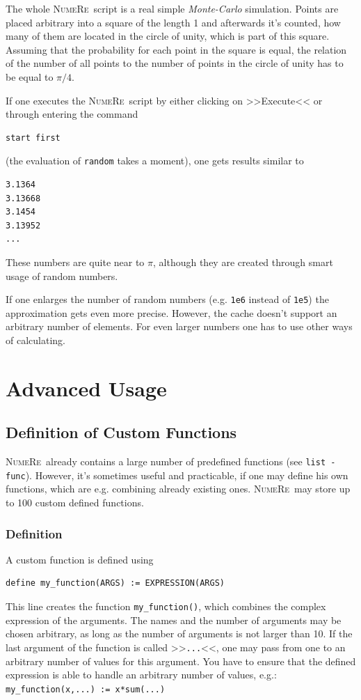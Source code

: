 \documentclass[DIV=14,headsepline,footsepline]{scrbook}
\newcommand{\NR}{\textsc{Nu\-me\-Re}}
\begin{document}
				The whole \NR\ script is a real simple \emph{Monte-Carlo} simulation. Points are placed arbitrary into a square of the length 1 and afterwards it's counted, how many of them are located in the circle of unity, which is part of this square. Assuming that the probability for each point in the square is equal, the relation of the number of all points to the number of points in the circle of unity has to be equal to $\pi/4$.
				
				If one executes the \NR\ script by either clicking on >>Execute<< or through entering the command
				\begin{lstlisting}
start first
				\end{lstlisting}
				(the evaluation of \lstinline+random+ takes a moment), one gets results similar to
				\begin{lstlisting}
3.1364
3.13668
3.1454
3.13952
...
				\end{lstlisting}
				These numbers are quite near to $\pi$, although they are created through smart usage of random numbers.
				
				If one enlarges the number of random numbers (e.g. \lstinline+1e6+ instead of \lstinline+1e5+) the approximation gets even more precise. However, the cache doesn't support an arbitrary number of elements. For even larger numbers one has to use other ways of calculating.
	\part{Advanced Usage}
		\chapter{Definition of Custom Functions}
			\NR\ already contains a large number of predefined functions (see \lstinline+list -func+). However, it's sometimes useful and practicable, if one may define his own functions, which are e.g. combining already existing ones. \NR\ may store up to 100 custom defined functions.
			\section{Definition}
				A custom function is defined using
				\begin{lstlisting}
define my_function(ARGS) := EXPRESSION(ARGS)
				\end{lstlisting}
				This line creates the function \lstinline+my_function()+, which combines the complex expression of the arguments. The names and the number of arguments may be chosen arbitrary, as long as the number of arguments is not larger than 10. If the last argument of the function is called >>\lstinline+...+<<, one may pass from one to an arbitrary number of values for this argument. You have to ensure that the defined expression is able to handle an arbitrary number of values, e.g.: \lstinline+my_function(x,...) := x*sum(...)+
				
\end{document}
